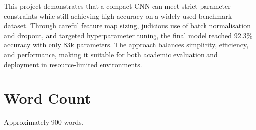 \documentclass[11pt]{article}
\begin{document}
This project demonstrates that a compact CNN can meet strict parameter constraints while still achieving high accuracy on a widely used benchmark dataset. Through careful feature map sizing, judicious use of batch normalisation and dropout, and targeted hyperparameter tuning, the final model reached 92.3\% accuracy with only 83k parameters. The approach balances simplicity, efficiency, and performance, making it suitable for both academic evaluation and deployment in resource-limited environments.

\section*{Word Count}
Approximately 900 words.
\end{document}
